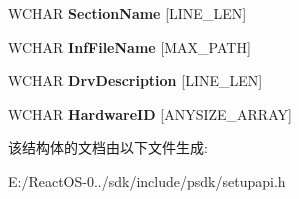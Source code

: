 \begin{DoxyCompactItemize}
W\+C\+H\+AR {\bfseries Section\+Name} \mbox{[}L\+I\+N\+E\+\_\+\+L\+EN\mbox{]}
\item 
\mbox{\label{struct___s_p___d_r_v_i_n_f_o___d_e_t_a_i_l___d_a_t_a___w_af167ea950ba6070ac0e10531768d4370}} 
W\+C\+H\+AR {\bfseries Inf\+File\+Name} \mbox{[}M\+A\+X\+\_\+\+P\+A\+TH\mbox{]}
\item 
\mbox{\label{struct___s_p___d_r_v_i_n_f_o___d_e_t_a_i_l___d_a_t_a___w_a0337da5fdc18bcb8fc8f809bbb077ccb}} 
W\+C\+H\+AR {\bfseries Drv\+Description} \mbox{[}L\+I\+N\+E\+\_\+\+L\+EN\mbox{]}
\item 
\mbox{\label{struct___s_p___d_r_v_i_n_f_o___d_e_t_a_i_l___d_a_t_a___w_ab73088ab33c906cfa9da9ee1344e4080}} 
W\+C\+H\+AR {\bfseries Hardware\+ID} \mbox{[}A\+N\+Y\+S\+I\+Z\+E\+\_\+\+A\+R\+R\+AY\mbox{]}
\end{DoxyCompactItemize}


该结构体的文档由以下文件生成\+:\begin{DoxyCompactItemize}
\item 
E\+:/\+React\+O\+S-\/0../sdk/include/psdk/setupapi.\+h\end{DoxyCompactItemize}
